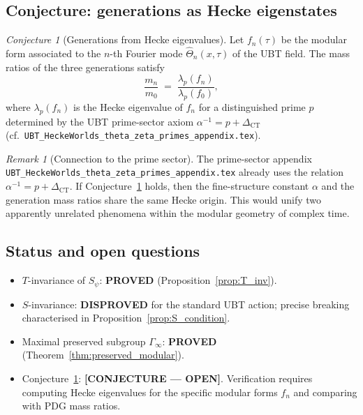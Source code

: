 \documentclass[12pt,a4paper]{article}
\theoremstyle{remark}
\newtheorem{remark}[theorem]{Remark}
\newtheorem{conjecture}[theorem]{Conjecture}
\begin{document}
\subsection{Conjecture: generations as Hecke eigenstates}

\begin{conjecture}[Generations from Hecke eigenvalues]
\label{conj:hecke_generations}
Let $f_n(\tau)$ be the modular form associated to the $n$-th Fourier
mode $\hat\Theta_n(x,\tau)$ of the UBT field.  The mass ratios of the
three generations satisfy
\begin{equation}
  \frac{m_n}{m_0}
  \;=\; \frac{\lambda_p(f_n)}{\lambda_p(f_0)},
\end{equation}
where $\lambda_p(f_n)$ is the Hecke eigenvalue of $f_n$ for a
distinguished prime $p$ determined by the UBT prime-sector axiom
$\alpha^{-1} = p + \Delta_{\mathrm{CT}}$
(cf.\ \texttt{UBT\_HeckeWorlds\_theta\_zeta\_primes\_appendix.tex}).
\end{conjecture}

\begin{remark}[Connection to the prime sector]
The prime-sector appendix \texttt{UBT\_HeckeWorlds\_theta\_zeta\_primes\_appendix.tex}
already uses the relation $\alpha^{-1} = p + \Delta_{\mathrm{CT}}$.  If
Conjecture~\ref{conj:hecke_generations} holds, then the fine-structure
constant $\alpha$ and the generation mass ratios share the same Hecke
origin.  This would unify two apparently unrelated phenomena within the
modular geometry of complex time.
\end{remark}

\subsection{Status and open questions}

\begin{itemize}
  \item $T$-invariance of $S_\psi$: \textbf{PROVED}
        (Proposition~\ref{prop:T_inv}).
  \item $S$-invariance: \textbf{DISPROVED} for the standard UBT action;
        precise breaking characterised in
        Proposition~\ref{prop:S_condition}.
  \item Maximal preserved subgroup $\Gamma_\infty$:
        \textbf{PROVED} (Theorem~\ref{thm:preserved_modular}).
  \item Conjecture~\ref{conj:hecke_generations}:
        \textbf{[CONJECTURE — OPEN]}.  Verification requires computing
        Hecke eigenvalues for the specific modular forms $f_n$ and
        comparing with PDG mass ratios.
\end{itemize}
\end{document}
